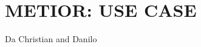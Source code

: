 \section{\uppercase{Metior: use case}}
\label{sec:introduction}


\noindent Da Christian and Danilo

\noindent\lipsum[2-4]
